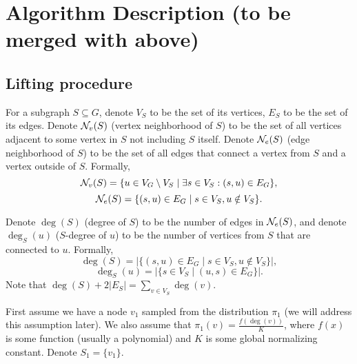 	
	\section{Algorithm Description (to be merged with above)}
	\subsection{Lifting procedure}
	
	For a subgraph $S \subseteq G$, denote $V_S$ to be the set of its vertices, $E_S$ to be the set of its edges.
	Denote $\mathcal{N}_v(S)$ (vertex neighborhood of $S$) to be the set of all vertices adjacent to some vertex in $S$ not including $S$ itself. 
	Denote $\mathcal{N}_e(S)$ (edge neighborhood of $S$) to be the set of all edges that connect a vertex from $S$ and a vertex outside of $S$.
	Formally,
	\begin{equation*}
		\mathcal{N}_v(S) = \{u\in V_G\setminus V_S \mid \exists s\in V_S : (s,u)\in E_G\},
	\end{equation*}
	\begin{equation*}
		\mathcal{N}_e(S) = \{(s,u)\in E_G \mid s\in V_S, u\notin V_S\}.
	\end{equation*}	
	
	Denote $\deg(S)$ (degree of $S$) to be the number of edges in $\mathcal{N}_e(S)$, and denote $\deg_S(u)$ ($S$-degree of $u$) to be the number of vertices from $S$ that are connected to $u$.
	Formally,
	\begin{equation*}
		\deg(S) = |\{(s,u)\in E_G \mid s\in V_S, u\notin V_S\}|,
	\end{equation*}
	\begin{equation*}
		\deg_S(u) = |\{s\in V_S\mid (u,s)\in E_G\}|.
	\end{equation*}
	Note that $\deg(S) + 2|E_S| = \sum_{v\in V_S} \deg(v)$.
	
	First assume we have a node $v_1$ sampled from the distribution $\pi_1$ (we will address this assumption later). 
	We also assume that $\pi_1(v) = \frac{f(\deg(v))}{K}$, where $f(x)$ is some function (usually a polynomial) and $K$ is some global normalizing constant.
	Denote $S_1 = \{v_1\}$.

